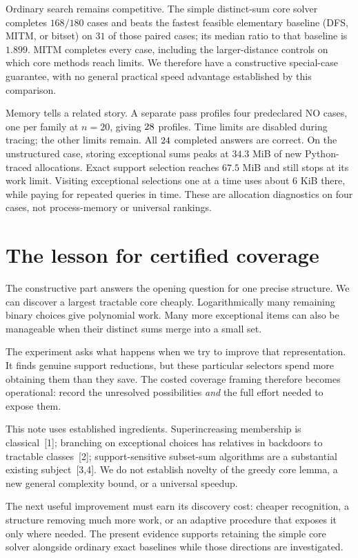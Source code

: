 \documentclass[10pt,english]{article}
\begin{document}
Ordinary search remains competitive. The simple distinct-sum core solver completes \(168/180\) cases and beats the fastest feasible elementary baseline (DFS, MITM, or bitset) on \(31\) of those paired cases; its median ratio to that baseline is \(1.899\). MITM completes every case, including the larger-distance controls on which core methods reach limits. We therefore have a constructive special-case guarantee, with no general practical speed advantage established by this comparison.

Memory tells a related story. A separate pass profiles four predeclared NO cases, one per family at \(n=20\), giving \(28\) profiles. Time limits are disabled during tracing; the other limits remain. All \(24\) completed answers are correct. On the unstructured case, storing exceptional sums peaks at \(34.3\) MiB of new Python-traced allocations. Exact support selection reaches \(67.5\) MiB and still stops at its work limit. Visiting exceptional selections one at a time uses about \(6\) KiB there, while paying for repeated queries in time. These are allocation diagnostics on four cases, not process-memory or universal rankings.

\section{The lesson for certified coverage}
The constructive part answers the opening question for one precise structure. We can discover a largest tractable core cheaply. Logarithmically many remaining binary choices give polynomial work. Many more exceptional items can also be manageable when their distinct sums merge into a small set.

The experiment asks what happens when we try to improve that representation. It finds genuine support reductions, but these particular selectors spend more obtaining them than they save. The costed coverage framing therefore becomes operational: record the unresolved possibilities \emph{and} the full effort needed to expose them.

This note uses established ingredients. Superincreasing membership is classical~[1]; branching on exceptional choices has relatives in backdoors to tractable classes~[2]; support-sensitive subset-sum algorithms are a substantial existing subject~[3,4]. We do not establish novelty of the greedy core lemma, a new general complexity bound, or a universal speedup.

The next useful improvement must earn its discovery cost: cheaper recognition, a structure removing much more work, or an adaptive procedure that exposes it only where needed. The present evidence supports retaining the simple core solver alongside ordinary exact baselines while those directions are investigated.
\end{document}
